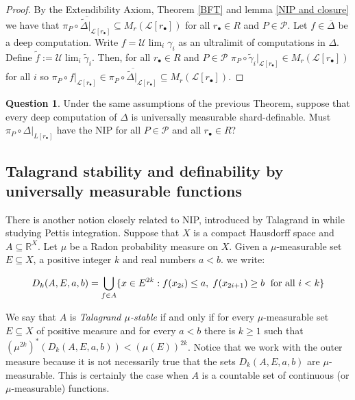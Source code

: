 \documentclass[psamsfonts]{amsart}
\theoremstyle{definition}
\newtheorem{question}[thm]{Question}
\theoremstyle{remark}
\numberwithin{equation}{section}
\begin{document}
\begin{proof}
    By the Extendibility Axiom, Theorem \ref{BFT} and lemma \ref{NIP and closure} we have that $\overline{\pi_P\circ\tilde\Delta|_{\mathcal{L}[r_\bullet]}}\subseteq M_r(\mathcal{L}[r_\bullet])$ for all $r_\bullet\in R$ and $P\in\mathcal{P}$. Let $f\in\overline{\Delta}$ be a deep computation. Write $f=\mathcal{U}\lim_i\gamma_i$ as an ultralimit of computations in $\Delta$. Define $\tilde f:=\mathcal{U}\lim_i\tilde\gamma_i$. Then, for all $r_\bullet\in R$ and $P\in\mathcal{P}$ $\pi_P \circ \tilde\gamma_i|_{\mathcal{L}[r_\bullet]}\in M_r(\mathcal{L}[r_\bullet])$ for all $i$ so $\pi_P \circ f|_{\mathcal{L}[r_\bullet]}\in \overline{\pi_P\circ\tilde\Delta|_{\mathcal{L}[r_\bullet]}}\subseteq M_r(\mathcal{L}[r_\bullet])$.
\end{proof}

\begin{question}
Under the same assumptions of the previous Theorem, suppose that every deep computation of $\Delta$ is universally measurable shard-definable. Must $\pi_P\circ\Delta|_{L[r_\bullet]}$ have the NIP for all $P\in\mathcal{P}$ and all $r_{\bullet}\in R$?
\end{question}

\subsection{Talagrand stability and definability by universally measurable functions}

There is another notion closely related to NIP, introduced by Talagrand in \cite{talagrand1984pettis} while studying Pettis integration. Suppose that $X$ is a compact Hausdorff space and $A\subseteq \mathbb{R}^X$. Let $\mu$ be a Radon probability measure on $X$. Given a $\mu$-measurable set $E\subseteq X$, a positive integer $k$ and real numbers $a<b$. we write:

$$D_k(A,E,a,b)=\bigcup_{f\in A}\{x\in E^{2k}:f(x_{2i})\leq a, \hspace{1mm} f(x_{2i+1})\geq b \hspace{1mm}{\text{ for all }i<k} \}$$

We say that $A$ is \emph{Talagrand $\mu$-stable} if and only if for every $\mu$-measurable set $E\subseteq X$ of positive measure and for every $a<b$ there is $k\geq 1$ such that $(\mu^{2k})^*(D_k(A,E,a,b))<(\mu(E))^{2k}$. Notice that we work with the outer measure because it is not necessarily true that the sets $D_k(A,E,a,b)$ are $\mu$-measurable. This is certainly the case when $A$ is a countable set of continuous (or $\mu$-measurable) functions. 
\end{document}
